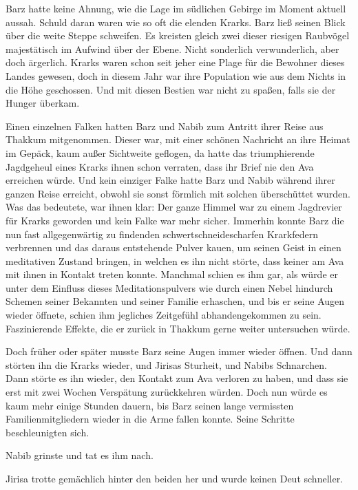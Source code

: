 Barz hatte keine Ahnung, wie die Lage im südlichen Gebirge im Moment aktuell aussah. Schuld daran waren wie so oft die elenden Krarks. Barz ließ seinen Blick über die weite Steppe schweifen. Es kreisten gleich zwei dieser riesigen Raubvögel majestätisch im Aufwind über der Ebene. Nicht sonderlich verwunderlich, aber doch ärgerlich. Krarks waren schon seit jeher eine Plage für die Bewohner dieses Landes gewesen, doch in diesem Jahr war ihre Population wie aus dem Nichts in die Höhe geschossen. Und mit diesen Bestien war nicht zu spaßen, falls sie der Hunger überkam.

Einen einzelnen Falken hatten Barz und Nabib zum Antritt ihrer Reise aus Thakkum mitgenommen. Dieser war, mit einer schönen Nachricht an ihre Heimat im Gepäck, kaum außer Sichtweite geflogen, da hatte das triumphierende Jagdgeheul eines Krarks ihnen schon verraten, dass ihr Brief nie den Ava erreichen würde. Und kein einziger Falke hatte Barz und Nabib während ihrer ganzen Reise erreicht, obwohl sie sonst förmlich mit solchen überschüttet wurden. Was das bedeutete, war ihnen klar: Der ganze Himmel war zu einem Jagdrevier für Krarks geworden und kein Falke war mehr sicher. Immerhin konnte Barz die nun fast allgegenwärtig zu findenden schwertschneidescharfen Krarkfedern verbrennen und das daraus entstehende Pulver kauen, um seinen Geist in einen meditativen Zustand bringen, in welchen es ihn nicht störte, dass keiner am Ava mit ihnen in Kontakt treten konnte. Manchmal schien es ihm gar, als würde er unter dem Einfluss dieses Meditationspulvers wie durch einen Nebel hindurch Schemen seiner Bekannten und seiner Familie erhaschen, und bis er seine Augen wieder öffnete, schien ihm jegliches Zeitgefühl abhandengekommen zu sein. Faszinierende Effekte, die er zurück in Thakkum gerne weiter untersuchen würde.

Doch früher oder später musste Barz seine Augen immer wieder öffnen. Und dann störten ihn die Krarks wieder, und Jirisas Sturheit, und Nabibs Schnarchen. Dann störte es ihn wieder, den Kontakt zum Ava verloren zu haben, und dass sie erst mit zwei Wochen Verspätung zurückkehren würden. Doch nun würde es kaum mehr einige Stunden dauern, bis Barz seinen lange vermissten Familienmitgliedern wieder in die Arme fallen konnte. Seine Schritte beschleunigten sich.

Nabib grinste und tat es ihm nach.

Jirisa trotte gemächlich hinter den beiden her und wurde keinen Deut schneller.\bigskip







